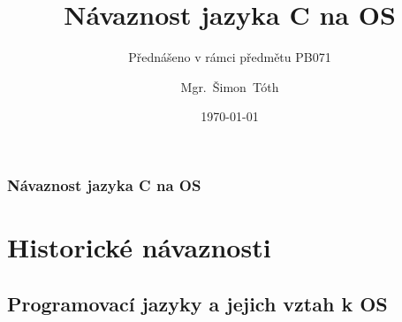 

\title{Návaznost jazyka C na OS}
\subtitle{Přednášeno v rámci předmětu PB071}
\author[]{Mgr.~Šimon~Tóth}
\date{\today}

\newcommand{\CcNote}[1]{%
        Licencováno pod: \textit{Creative Commons #1 3.0 License}.%
}



\begin{frame}
  \titlepage
\end{frame}

\begin{frame}
  \frametitle{Návaznost jazyka C na OS}
  \tableofcontents
\end{frame}

\section{Historické návaznosti}
\subsection{Programovací jazyky a jejich vztah k OS}

